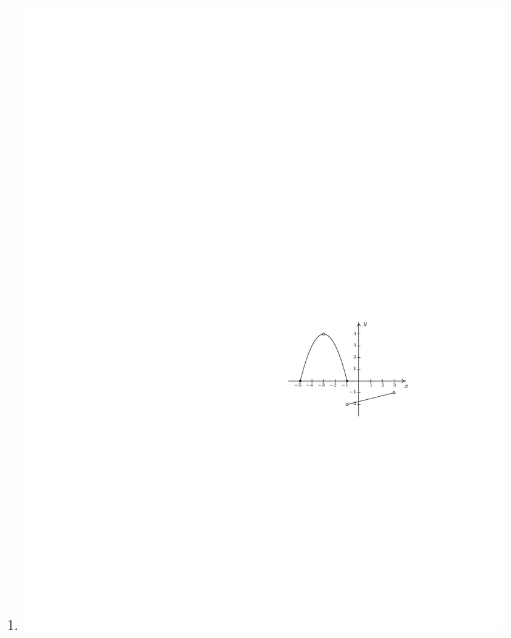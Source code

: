 \documentclass{ximera}
\begin{document}
\begin{exercise}
\begin{enumerate}
\item{\includegraphics{WiaFgraphs1-5.pdf}}
\end{enumerate}

\begin{selectAll}
\end{selectAll}

\end{exercise}
\end{document}
